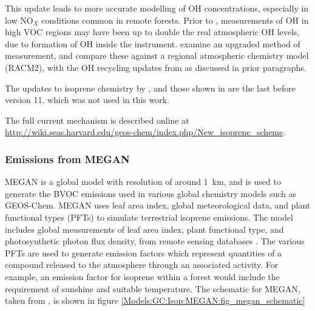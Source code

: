       This update leads to more accurate modelling of OH concentrations, especially in low NO$_X$ conditions common in remote forests.
      Prior to \citet{Mao2012}, measurements of OH in high VOC regions may have been up to double the real atmospheric OH levels, due to formation of OH inside the instrument.
      \citet{Mao2012} examine an upgraded method of measurement, and compare these against a regional atmospheric chemistry model (RACM2), with the OH recycling updates from \citet{Paulot2009b} as discussed in prior paragraphs.
      
      The updates to isoprene chemistry by \citet{Mao2013}, and those shown in \cite{Crounse2011,Crounse2012} are the last before version 11, which was not used in this work.
      
      The full current mechanism is described online at \url{http://wiki.seas.harvard.edu/geos-chem/index.php/New_isoprene_scheme}.
    
    
    \subsubsection{Emissions from MEGAN}
      \label{Model:GC:Isop:MEGAN}

      MEGAN is a global model with resolution of around 1~km, and is used to generate the BVOC emissions used in various global chemistry models such as GEOS-Chem.
      MEGAN uses leaf area index, global meteorological data, and plant functional types (PFTs) to simulate terrestrial isoprene emissions.
      The model includes global measurements of leaf area index, plant functional type, and photosynthetic photon flux density, from remote sensing databases \citep{Kefauver2014}.
      The various PFTs are used to generate emission factors which represent quantities of a compound released to the atmosphere through an associated activity.
      For example, an emission factor for isoprene within a forest would include the requirement of sunshine and suitable temperature.
      The schematic for MEGAN, taken from \citet{Megan_Website}, is shown in figure \ref{Models:GC:Isop:MEGAN:fig_megan_schematic}
      
